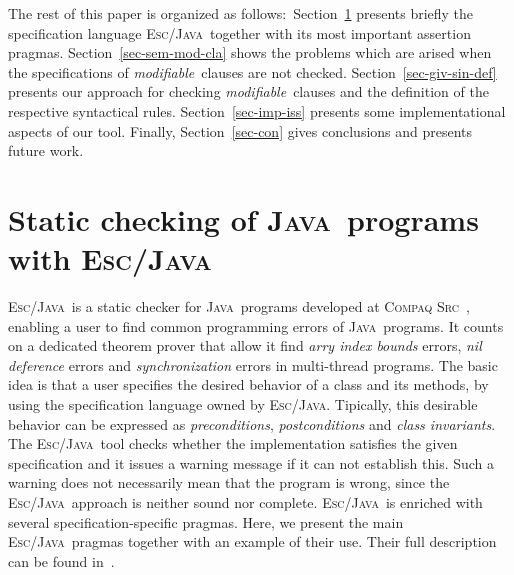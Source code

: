 \documentclass[a4paper]{llncs}
\newcommand{\escj}{\textsc{Esc/Java}}
\newcommand{\java}{\textsc{Java}}
\newcommand{\csrc}{\textsc{Compaq Src}}
\newcommand{\modif}{\textit{modifiable}}
\begin{document}
The rest of this paper is organized as follows$:$
Section~\ref{sec-esc-prg} presents briefly the specification language
\escj~together with its most important assertion
pragmas. Section~\ref{sec-sem-mod-cla} shows the problems which are
arised when the specifications of \modif~clauses are not
checked. Section~\ref{sec-giv-sin-def}
presents our approach for checking \modif~clauses and the definition
of the respective syntactical rules. Section~\ref{sec-imp-iss} presents
some implementational aspects of our tool. Finally, Section~\ref{sec-con}
gives conclusions and presents future work.






\section{Static checking of \java~programs with \escj}
\label{sec-esc-prg}






\escj~is a static checker for \java~programs developed
at \csrc~\cite{ESC}, enabling a user to find common programming
errors of \java~programs. It counts on a dedicated theorem prover
that allow it find \emph{arry index bounds}
errors, \emph{nil deference} errors and \emph{synchronization} errors
in multi-thread programs. The basic idea is that
a user specifies the desired behavior of a class and its methods, by
using the specification language owned by \escj. Tipically, this
desirable behavior can be expressed as \textit{preconditions},
\textit{postconditions} and \textit{class invariants}. The \escj~tool
checks whether the implementation satisfies the given
specification and it issues a warning 
message if it can not establish this. Such a
warning does not necessarily mean that the program is
wrong, since the \escj~approach is neither sound nor
complete. \escj~is enriched with several
specification-specific pragmas. Here, we present
the main \escj~pragmas together with an example of their
use. Their full description can be found in~\cite{LeinoNS00}. 
\end{document}
